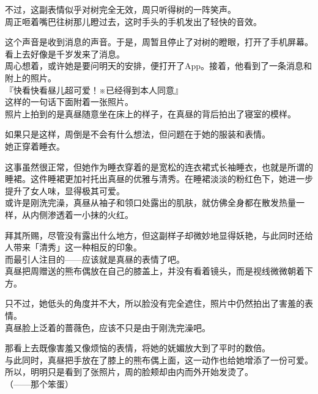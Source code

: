 不过，这副表情似乎对树完全无效，周只听得树的一阵笑声。\\

周正咂着嘴巴往树那儿瞪过去，这时手头的手机发出了轻快的音效。

这个声音是收到消息的声音。于是，周暂且停止了对树的瞪眼，打开了手机屏幕。看上去好像是千岁发来了消息。\\

周心想着，或许她是要问明天的安排，便打开了App。接着，他看到了一条消息和附上的照片。\\

『快看快看昼儿超可爱！※已经得到本人同意』\\

这样的一句话下面附着一张照片。\\

照片上拍到的是真昼随意坐在床上的样子，在真昼的背后拍出了寝室的模样。

如果只是这样，周倒是不会有什么想法，但问题在于她的服装和表情。\\

她正穿着睡衣。

这事虽然很正常，但她作为睡衣穿着的是宽松的连衣裙式长袖睡衣，也就是所谓的睡裙。这件睡裙更加衬托出真昼的优雅与清秀。在睡裙淡淡的粉红色下，她进一步提升了女人味，显得极其可爱。\\

或许是刚洗完澡，真昼从袖子和领口处露出的肌肤，就仿佛全身都在散发热量一样，从内侧渗透着一小抹的火红。

拜其所赐，尽管没有露出什么地方，但这副样子却微妙地显得妖艳，与此同时还给人带来「清秀」这一种相反的印象。\\

而最引人注目的——应该就是真昼的表情了吧。\\

真昼把周赠送的熊布偶放在自己的膝盖上，并没有看着镜头，而是视线微微朝着下方。

只不过，她低头的角度并不大，所以脸没有完全遮住，照片中仍然拍出了害羞的表情。\\

真昼脸上泛着的蔷薇色，应该不只是由于刚洗完澡吧。

那看上去既像害羞又像烦恼的表情，将她的妩媚放大到了平时的数倍。\\

与此同时，真昼把手放在了膝上的熊布偶上面，这一动作也给她增添了一份可爱。所以，明明只是看到了张照片，周的脸颊却由内而外开始发烫了。\\

（——那个笨蛋）\\

